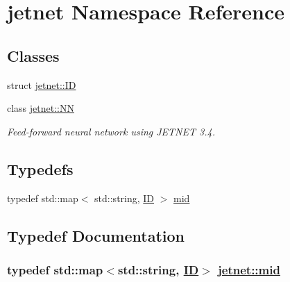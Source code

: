 \hypertarget{namespacejetnet}{
\section{jetnet Namespace Reference}
\label{namespacejetnet}
}




\subsection*{Classes}
\begin{CompactItemize}
\item 
struct \hyperlink{structjetnet_1_1ID}{jetnet::ID}
\item 
class \hyperlink{classjetnet_1_1NN}{jetnet::NN}
\begin{CompactList}\small\item\em Feed-forward neural network using JETNET 3.4. \item\end{CompactList}\end{CompactItemize}
\subsection*{Typedefs}
\begin{CompactItemize}
\item 
typedef std::map$<$ std::string, \hyperlink{structjetnet_1_1ID}{ID} $>$ \hyperlink{namespacejetnet_a0}{mid}
\end{CompactItemize}


\subsection{Typedef Documentation}
\hypertarget{namespacejetnet_a0}{
\subsubsection[mid]{\setlength{\rightskip}{0pt plus 5cm}typedef std::map$<$std::string, \hyperlink{structjetnet_1_1ID}{ID}$>$ \hyperlink{namespacejetnet_a0}{jetnet::mid}}}
\label{namespacejetnet_a0}


